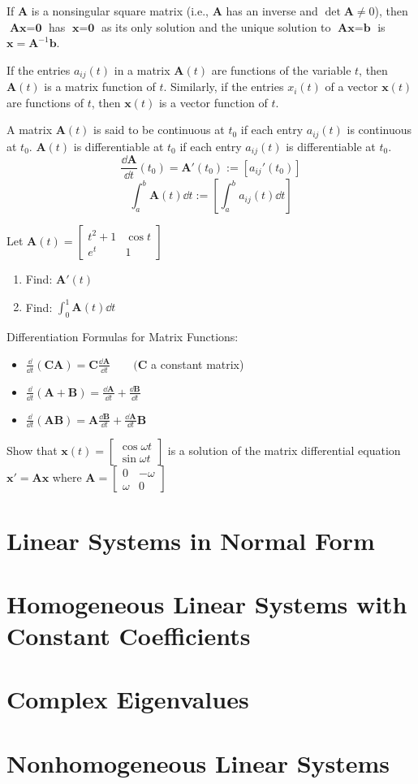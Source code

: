 \documentclass[../diffeq.tex]{subfiles}
\begin{document}
If $\textbf{A}$ is a nonsingular square matrix (i.e., $\textbf{A}$ has an inverse and $\det \textbf{A}\neq 0$), then $\textbf{Ax}=\textbf{0}$ has $\textbf{x}=\textbf{0}$ as its only solution and the unique solution to 
$\textbf{Ax}=\textbf{b}$ is $\textbf{x}=\textbf{A}^{-1}\textbf{b}$.

If the entries $a_{ij}(t)$ in a matrix $\textbf{A}(t)$ are functions of the variable $t$, then $\textbf{A}(t)$ is a matrix function of $t$. Similarly, if the entries $x_i(t)$ of a vector 
$\textbf{x}(t)$ are functions of $t$, then $\textbf{x}(t)$ is a vector function of $t$.

A matrix $\textbf{A}(t)$ is said to be continuous at $t_0$ if each entry $a_{ij}(t)$ is continuous at $t_0$. $\textbf{A}(t)$ is differentiable at $t_0$ if each entry $a_{ij}(t)$ is differentiable at $t_0$.
\[ \frac{\dd \textbf{A}}{\dd t}(t_0)=\textbf{A}'(t_0):= [a_{ij}'(t_0)]\]
\[ \int_a^b \textbf{A}(t)\dd t := \left[\int_a^b a_{ij}(t)\dd t \right]\]

\ex Let $\textbf{A}(t)=\begin{bmatrix}
    t^2+1 & \cos t \\
    e^t & 1
\end{bmatrix}$
\begin{enumerate}
    \item Find: $\textbf{A}'(t)$
    \item Find: $\int_0^1 \textbf{A}(t)\dd t$
\end{enumerate}

Differentiation Formulas for Matrix Functions:
\begin{itemize}
    \item $\frac{\dd}{\dd t}(\textbf{CA})=\textbf{C}\frac{\dd \textbf{A}}{\dd t} \qquad (\textbf{C}$ a constant matrix)
    \item $\frac{\dd}{\dd t}(\textbf{A}+\textbf{B})=\frac{\dd \textbf{A}}{\dd t}+\frac{\dd \textbf{B}}{\dd t}$
    \item $\frac{\dd}{\dd t}(\textbf{AB})=\textbf{A}\frac{\dd \textbf{B}}{\dd t}+\frac{\dd \textbf{A}}{\dd t}\textbf{B}$
\end{itemize}

\ex Show that $\textbf{x}(t)=\begin{bmatrix}
    \cos \omega t\\
    \sin \omega t
\end{bmatrix}$ is a solution of the matrix differential equation $\textbf{x}'=\textbf{Ax}$ where $\textbf{A}=\begin{bmatrix}
    0 & -\omega \\
    \omega & 0
\end{bmatrix}$

\section{Linear Systems in Normal Form}
\section{Homogeneous Linear Systems with Constant Coefficients}
\section{Complex Eigenvalues}
\section{Nonhomogeneous Linear Systems}
\end{document}
